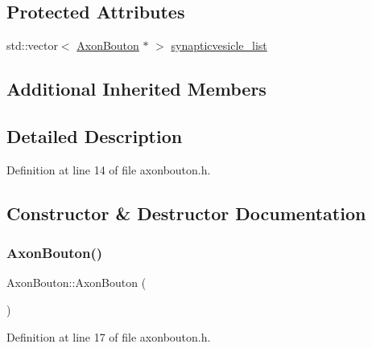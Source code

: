 \subsection*{Protected Attributes}
\begin{DoxyCompactItemize}
\item 
std\+::vector$<$ \hyperlink{class_axon_bouton}{Axon\+Bouton} $\ast$ $>$ \hyperlink{class_axon_bouton_ad5b4e9b5fefb2ad9e6dfe5ad91be2dd7}{synapticvesicle\+\_\+list}
\end{DoxyCompactItemize}
\subsection*{Additional Inherited Members}


\subsection{Detailed Description}


Definition at line 14 of file axonbouton.\+h.



\subsection{Constructor \& Destructor Documentation}
\mbox{\label{class_axon_bouton_acd6521d65ecb2b86abf2e3a8b322699e}} 
\subsubsection{\texorpdfstring{Axon\+Bouton()}{AxonBouton()}\hspace{0.1cm}{\footnotesize\ttfamily [1/4]}}
{\footnotesize\ttfamily Axon\+Bouton\+::\+Axon\+Bouton (\begin{DoxyParamCaption}{ }\end{DoxyParamCaption})\hspace{0.3cm}{\ttfamily [inline]}}



Definition at line 17 of file axonbouton.\+h.

\mbox{\label{class_axon_bouton_a8a2da76b259a5ebab397fbd89d8b0632}} 
